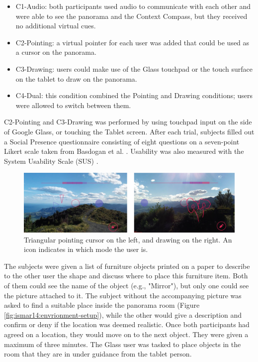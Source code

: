 \begin{itemize}
    \item C1-Audio: both participants used audio to communicate with each other and were able to see the panorama and the Context Compass, but they received no additional virtual cues. 
    \item C2-Pointing: a virtual pointer for each user was added that could be used as a cursor on the panorama.
    \item C3-Drawing: users could make use of the Glass touchpad or the touch surface on the tablet to draw on the panorama. 
    \item C4-Dual: this condition combined the Pointing and Drawing conditions; users were allowed to switch between them.
\end{itemize}{}

C2-Pointing and C3-Drawing was performed by using touchpad input on the side of Google Glass, or touching the Tablet screen. After each trial, subjects filled out a Social Presence questionnaire consisting of eight questions on a seven-point Likert scale taken from Basdogan et al. \cite{Basdogan2001}. Usability was also measured with the System Usability Scale (SUS) \cite{brooke1996sus}.

\begin{figure}
    \centering
    \includegraphics[width=\linewidth]{images/63-pano-ismar14/pointing-drawing}
    \caption{Triangular pointing cursor on the left, and drawing on the right. An icon indicates in which mode the user is.}
    \label{fig:ismar14:pointing-drawing}
\end{figure}

The subjects were given a list of furniture objects printed on a paper to describe to the other user the shape and discuss where to place this furniture item. Both of them could see the name of the object (e.g., "Mirror"), but only one could see the picture attached to it. The subject without the accompanying picture was asked to find a suitable place inside the panorama room (Figure \ref{fig:ismar14:envrionment-setup}), while the other would give a description and confirm or deny if the location was deemed realistic. Once both participants had agreed on a location, they would move on to the next object. They were given a maximum of three minutes. The Glass user was tasked to place objects in the room that they are in under guidance from the tablet person.

